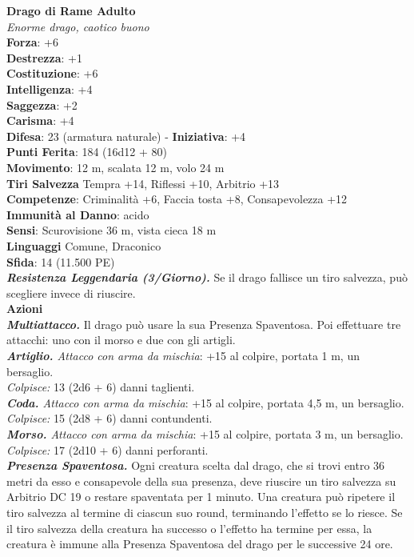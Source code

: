 \begin{multicols}{2}
\medskip\textbf{Drago di Rame Adulto}\\
\emph{Enorme drago, caotico buono}\\
\textbf{Forza}: +6\\
\textbf{Destrezza}: +1\\
\textbf{Costituzione}: +6\\
\textbf{Intelligenza}: +4\\
\textbf{Saggezza}: +2\\
\textbf{Carisma}: +4\\
\textbf{Difesa}: 23 (armatura naturale) - \textbf{Iniziativa}: +4\\
\textbf{Punti Ferita}: 184 (16d12 + 80)\\
\textbf{Movimento}: 12 m, scalata 12 m, volo 24 m\\
\textbf{Tiri Salvezza} Tempra +14, Riflessi +10, Arbitrio +13\\
\textbf{Competenze}: Criminalità +6, Faccia tosta +8, Consapevolezza +12\\
\textbf{Immunità al Danno}: acido\\
\textbf{Sensi}: Scurovisione 36 m, vista cieca 18 m\\
\textbf{Linguaggi} Comune, Draconico\\
\textbf{Sfida}: 14 (11.500 PE)\smallskip\\
\emph{\textbf{Resistenza Leggendaria (3/Giorno).}} Se il drago fallisce un tiro salvezza, può scegliere invece di riuscire.\\
\smallskip\textbf{Azioni} \\
\emph{\textbf{Multiattacco.}} Il drago può usare la sua Presenza Spaventosa. Poi effettuare tre attacchi: uno con il morso e due con gli artigli.\\
\emph{\textbf{Artiglio.} Attacco con arma da mischia}: +15 al colpire, portata 1 m, un bersaglio.\\
\emph{Colpisce:} 13 (2d6 + 6) danni taglienti.\\
\emph{\textbf{Coda.} Attacco con arma da mischia}: +15 al colpire, portata 4,5 m, un bersaglio.\\
\emph{Colpisce:} 15 (2d8 + 6) danni contundenti.\\
\emph{\textbf{Morso.} Attacco con arma da mischia}: +15 al colpire, portata 3 m, un bersaglio.\\
\emph{Colpisce:} 17 (2d10 + 6) danni perforanti.\\
\emph{\textbf{Presenza Spaventosa.}} Ogni creatura scelta dal drago, che si trovi entro 36 metri da esso e consapevole della sua presenza, deve riuscire un tiro salvezza su Arbitrio DC  19 o restare spaventata per 1 minuto. Una creatura può ripetere il tiro salvezza al termine di ciascun suo round, terminando l'effetto se lo riesce. Se il tiro salvezza della creatura ha successo o l'effetto ha termine per essa, la creatura è immune alla Presenza Spaventosa del drago per le successive 24 ore. \\

\end{multicols}
